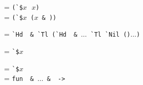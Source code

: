 \documentclass{article}
\begin{document}

 = \verb|(`$|$x\texttt{ }x$\verb|)| \\
 = \verb|(`$|$x$\verb! (!$x$\verb| & |\verb|))| \\


 = \verb|`Hd |\verb| & `Tl (`Hd |\verb| & |$\ldots$\verb| `Tl `Nil ()|$\ldots$\verb|)| \\


 = \verb|`$|$x$\verb| | \\


 = \verb|`$|$x$\verb| | \\
 = \verb|fun |\verb| & |$\ldots$\verb| & |\verb| -> | \\
\end{document}
